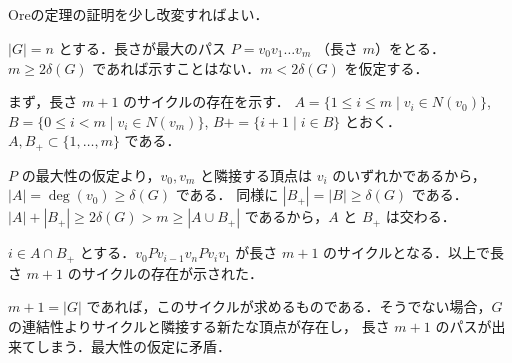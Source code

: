 \subsection{}
Oreの定理の証明を少し改変すればよい．

$|G| = n$ とする．長さが最大のパス $P = v_0v_1\ldots v_m$ （長さ $m$）をとる．$m\geq 2\delta(G)$ であれば示すことはない．$m < 2\delta(G)$ を仮定する．

まず，長さ $m+1$ のサイクルの存在を示す．
$A = \{1\leq i\leq m\mid v_i \in N(v_0)\}$, 
$B = \{0\leq i < m\mid v_i \in N(v_m)\}$, 
$B+ = \{i + 1\mid i \in B\}$ とおく．
$A, B_+\subset \{1,\ldots, m\}$ である．

$P$ の最大性の仮定より，$v_0, v_m$ と隣接する頂点は $v_i$ のいずれかであるから，$|A| = \deg(v_0) \geq \delta(G)$ である．
同様に $|B_+| = |B| \geq \delta(G)$ である．$|A| + |B_+| \geq 2\delta(G) > m \geq |A\cup B_+|$ であるから，$A$ と $B_+$ は交わる．

$i \in A\cap B_+$ とする．$v_0Pv_{i-1}v_nPv_iv_1$ が長さ $m+1$ のサイクルとなる．以上で長さ $m+1$ のサイクルの存在が示された．

$m + 1 = |G|$ であれば，このサイクルが求めるものである．そうでない場合，$G$ の連結性よりサイクルと隣接する新たな頂点が存在し，
長さ $m+1$ のパスが出来てしまう．最大性の仮定に矛盾．
